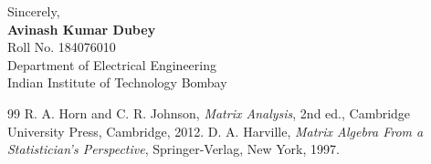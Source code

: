 \documentclass[11pt,a4paper]{article}
\begin{document}
\vspace{14pt}
Sincerely,\\[18pt]
\textbf{Avinash Kumar Dubey}\\
Roll No. 184076010\\
Department of Electrical Engineering\\
Indian Institute of Technology Bombay

\clearpage
\begin{thebibliography}{99}
	R. A. Horn and C. R. Johnson,
	\textit{Matrix Analysis},
	2nd ed., Cambridge University Press, Cambridge, 2012.
	D. A. Harville,
	\textit{Matrix Algebra From a Statistician's Perspective},
	Springer-Verlag, New York, 1997.
\end{thebibliography}
\end{document}
